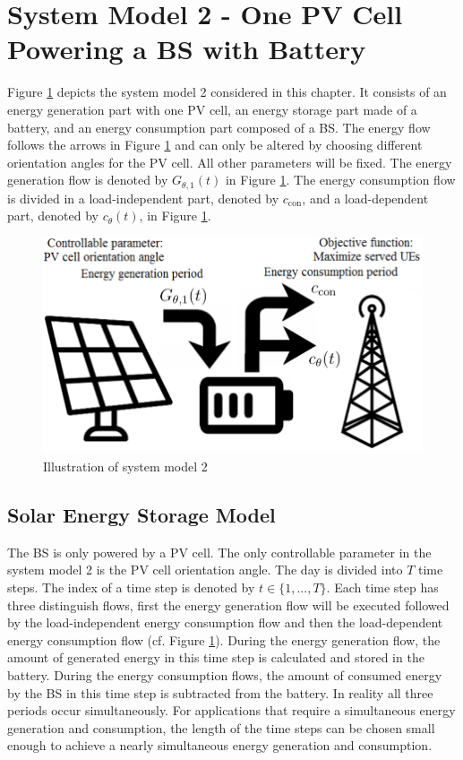 \section{System Model 2 - One PV Cell Powering a BS with Battery\label{system_2}}






Figure  \ref{ene2} depicts the system model 2 considered in this chapter. It consists of an energy generation part with one PV cell, an energy storage part made of a battery, and an energy consumption part composed of a BS. The energy flow follows the arrows in Figure  \ref{ene2} and can only be altered by choosing different orientation angles for the PV cell. All other parameters will be fixed. The energy generation flow is denoted by $G_{\theta,1}(t)$ in Figure \ref{ene2}. The energy consumption flow is divided in a load-independent part, denoted by $c_{\mathrm{con}}$, and a load-dependent part, denoted by $c_\theta(t)$, in Figure \ref{ene2}.

\begin{figure}[H]
	\centering	
		\includegraphics[width=1\columnwidth]{pictures/qq}
\caption{Illustration of system model 2\label{ene2}}
\end{figure}

\subsection{Solar Energy Storage Model}
The BS is only powered by a PV cell. The only controllable parameter in the system model 2 is the PV cell orientation angle. The day is divided into $T$ time steps. The index of a time step is denoted by $t \in \{1,...,T\}$.
Each time step has three distinguish flows, first the energy generation flow will be executed followed by the load-independent energy consumption flow and then the load-dependent energy consumption flow (cf. Figure \ref{ene2}). During the energy generation flow, the amount of generated energy in this time step is calculated and stored in the battery. During the energy consumption flows, the amount of consumed energy by the BS in this time step is subtracted from the battery. In reality all three periods occur simultaneously. For applications that require a simultaneous energy generation and consumption, the length of the time steps can be chosen small enough to achieve a nearly simultaneous energy generation and consumption. 





